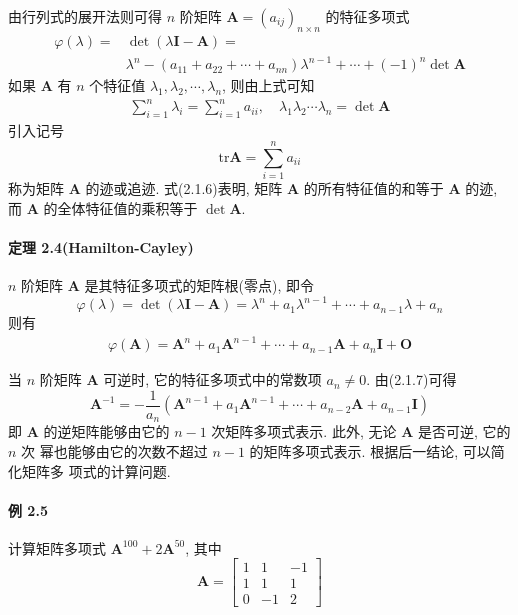 \par 由行列式的展开法则可得 $n$ 阶矩阵 $\bm{A} = (a_{ij})_{n\times n}$ 的特征多项式
\begin{align*}
    \varphi(\lambda) = & \det(\lambda\bm{I} - \bm{A}) =                                                           \\
                       & \lambda^n - (a_{11} + a_{22} + \cdots + a_{nn})\lambda^{n-1} + \cdots + (-1)^n\det\bm{A}
\end{align*}
如果 $\bm{A}$ 有 $n$ 个特征值 $\lambda_1, \lambda_2, \cdots, \lambda_n$, 则由上式可知
\begin{gather}
    \sum\limits_{i=1}^n \lambda_i = \sum\limits_{i=1}^n a_{ii}, \quad \lambda_1\lambda_2\cdots\lambda_n = \det\bm{A}
    \tag{2.1.6}
\end{gather}
引入记号
$$
    \mathrm{tr}\bm{A} = \sum\limits_{i=1}^n a_{ii}
$$
称为矩阵 $\bm{A}$ 的迹或追迹. 式(2.1.6)表明, 矩阵 $\bm{A}$ 的所有特征值的和等于 $\bm{A}$ 的迹, 而 $\bm{A}$
的全体特征值的乘积等于 $\det\bm{A}$.

\paragraph*{定理 2.4(Hamilton-Cayley)} $n$ 阶矩阵 $\bm{A}$ 是其特征多项式的矩阵根(零点), 即令
$$
    \varphi(\lambda) = \det(\lambda\bm{I} - \bm{A}) = \lambda^n + a_1\lambda^{n-1} + \cdots + a_{n-1}\lambda + a_n
$$
则有
\begin{gather}
    \varphi(\bm{A}) = \bm{A}^n + a_1\bm{A}^{n-1} + \cdots + a_{n-1}\bm{A} + a_n\bm{I} + \bm{O}
    \tag{2.1.7}
\end{gather}

\par 当 $n$ 阶矩阵 $\bm{A}$ 可逆时, 它的特征多项式中的常数项 $a_n \neq 0$. 由(2.1.7)可得
$$
    \bm{A}^{-1} = -\dfrac{1}{a_n}(\bm{A}^{n-1} + a_1\bm{A}^{n-1} + \cdots + a_{n-2}\bm{A} + a_{n-1}\bm{I})
$$
即 $\bm{A}$ 的逆矩阵能够由它的 $n - 1$ 次矩阵多项式表示. 此外, 无论 $\bm{A}$ 是否可逆, 它的 $n$ 次
幂也能够由它的次数不超过 $n - 1$ 的矩阵多项式表示. 根据后一结论, 可以简化矩阵多
项式的计算问题.

\paragraph*{例 2.5} 计算矩阵多项式 $\bm{A}^{100} + 2\bm{A}^{50}$, 其中
$$
    \bm{A} = \begin{bmatrix}
        1 & 1  & -1 \\
        1 & 1  & 1  \\
        0 & -1 & 2
    \end{bmatrix}
$$

